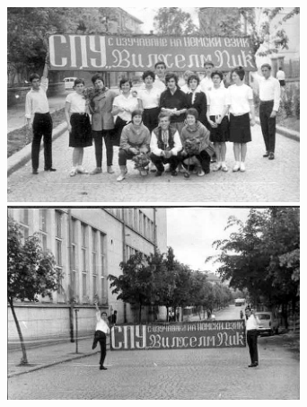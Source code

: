 \begin{multicols}{2}
\includegraphics[width=3.4in]{./zdravei_az/2-4.jpg}
\includegraphics[width=3.4in]{./zdravei_az/2-5.jpg}

\closearticle
\end{multicols}